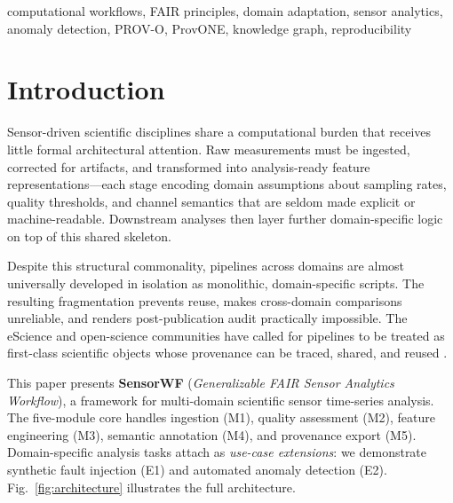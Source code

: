 \documentclass[conference]{IEEEtran}
\begin{document}
\begin{IEEEkeywords}
computational workflows, FAIR principles, domain adaptation, sensor analytics, anomaly detection, PROV-O, ProvONE, knowledge graph, reproducibility
\end{IEEEkeywords}

\section{Introduction}

Sensor-driven scientific disciplines share a computational burden that receives little formal architectural attention. Raw measurements must be ingested, corrected for artifacts, and transformed into analysis-ready feature representations---each stage encoding domain assumptions about sampling rates, quality thresholds, and channel semantics that are seldom made explicit or machine-readable. Downstream analyses then layer further domain-specific logic on top of this shared skeleton.

Despite this structural commonality, pipelines across domains are almost universally developed in isolation as monolithic, domain-specific scripts. The resulting fragmentation prevents reuse, makes cross-domain comparisons unreliable, and renders post-publication audit practically impossible. The eScience and open-science communities have called for pipelines to be treated as first-class scientific objects whose provenance can be traced, shared, and reused \cite{wilkinson2016fair,garijo2022fair}.

This paper presents \textbf{SensorWF} (\emph{Generalizable FAIR Sensor Analytics Workflow}), a framework for multi-domain scientific sensor time-series analysis. The five-module core handles ingestion (M1), quality assessment (M2), feature engineering (M3), semantic annotation (M4), and provenance export (M5). Domain-specific analysis tasks attach as \emph{use-case extensions}: we demonstrate synthetic fault injection (E1) and automated anomaly detection (E2). Fig.~\ref{fig:architecture} illustrates the full architecture.
\end{document}
